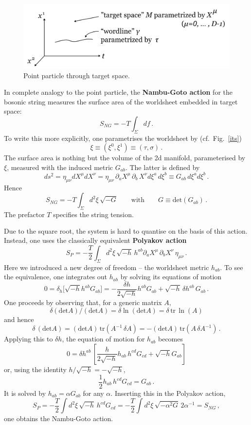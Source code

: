 \documentclass[12pt]{article}
\newcommand{\be}{\begin{equation}}
\newcommand{\ee}{\end{equation}}
\numberwithin{equation}{section}
\begin{document}
\begin{figure}[ht]
\begin{center} 
\includegraphics[width=12cm]{ppp.png}
\caption{Point particle through target space.}
\label{ppp} 
\end{center}
\end{figure}

In complete analogy to the point particle, the {\bf Nambu-Goto action} for the bosonic string measures the surface area of the worldsheet embedded in target space:
\be
S_{NG}=-T\int_\Sigma df\,.
\ee
To write this more explicitly, one parametrises the worldsheet by (cf.~Fig.~\ref{its})
\be
\xi \equiv (\xi^0,\xi^1) \equiv (\tau,\sigma)\,.
\ee
The surface area is nothing but the volume of the 2d manifold, parameterised by $\xi$, measured with the induced metric $G_{ab}$. The latter is defined by
\be
ds^2=\eta_{\mu\nu}dX^\mu dX^\nu=\eta_{\mu\nu}\,\partial_aX^\mu\,\partial_b\,X^\nu d\xi^a\,d\xi^b  
\equiv G_{ab}\,d\xi^a d\xi^b\,.
\ee
Hence
\be
S_{NG}=-T\int_\Sigma d^2\xi\,\sqrt{-G}\qquad\mbox{with}\qquad G\equiv\mbox{det}(G_{ab})\,. 
\ee
The prefactor $T$ specifies the string tension. 

Due to the square root, the system is hard to quantise on the basis of this action. Instead, one uses the classically equivalent {\bf Polyakov action} \cite{Deser:1976rb, Brink:1976sc, Polyakov:1981rd}
\be
S_P=-\frac{T}{2}\int_\Sigma d^2 \xi\,\sqrt{-h}\,h^{ab}\partial_aX^\mu\,\partial_b X^\nu\,\eta_{\mu\nu}\,.
\ee
Here we introduced a new degree of freedom -- the worldsheet metric $h_{ab}$. To see the equivalence, one integrates out $h_{ab}$ by solving its equations of motion
\be
0=\delta_h\big[\sqrt{-h}h^{ab}G_{ab}\big]=-\frac{\delta h}{2\sqrt{-h}}h^{ab}G_{ab}+\sqrt{-h}\,\delta h^{ab}\,G_{ab}\,.
\ee
One proceeds by observing that, for a generic matrix $A$,
\be
\delta(\mbox{det}A)/(\mbox{det}A)=\delta\ln(\mbox{det}A)=\delta\,\mbox{tr}\,
\ln(A)
\ee
and hence
\be
\delta\,(\mbox{det}A)=(\mbox{det}A)\,\mbox{tr}(A^{-1}\,\delta A)= -(\mbox{det}A)\,\mbox{tr}(A\,\delta A^{-1})\,.
\ee
Applying this to $\delta h$, the equation of motion for $h_{ab}$ becomes
\be
0=\delta h^{ab}\,\left[\frac{h}{2\sqrt{-h}}h_{ab}\,h^{cd}G_{cd}+\sqrt{-h}G_{ab}
\right]
\ee
or, using the identity $h/\sqrt{-h}=-\sqrt{-h}$, 
\be
\frac{1}{2}h_{ab}\,h^{cd}G_{cd}=G_{ab}\,.
\ee
It is solved by $h_{ab}=\alpha G_{ab}$ for any $\alpha$. Inserting this in the Polyakov action,
\be
S_P=-\frac{T}{2}\int d^2\xi\,\sqrt{-h}\,h^{cd}G_{cd}=-\frac{T}{2}\int d^2\xi\,\sqrt{-\alpha^2G}\,2\alpha^{-1}=S_{NG}\,,
\ee
one obtains the Nambu-Goto action.
\end{document}
